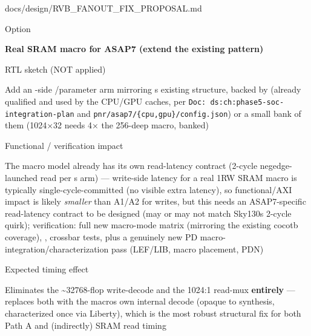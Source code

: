 \begin{relocated}{docs/design/RVB_FANOUT_FIX_PROPOSAL.md}
\begin{rowtable}
\begin{rowcell}{Option}

\textbf{Real SRAM macro for ASAP7 (extend the existing
 pattern)}

\end{rowcell}

\begin{rowcell}{RTL sketch (NOT applied)}

Add an -side /\allowbreak{}parameter arm
mirroring \textquotesingle s existing
 structure, backed by 
(already qualified and used by the CPU/GPU caches, per
\texttt{Doc:\allowbreak{}\ ds:\allowbreak{}ch:\allowbreak{}phase5-\allowbreak{}soc-\allowbreak{}integration-\allowbreak{}plan}
and
\texttt{pnr/\allowbreak{}asap7/\allowbreak{}\{cpu,\allowbreak{}gpu\}/\allowbreak{}config.\allowbreak{}json})
or a small bank of them (1024×32 needs 4× the 256-deep macro, banked)

\end{rowcell}

\begin{rowcell}{Functional / verification impact}

The macro model already has its own read-latency contract (2-cycle
negedge-launched read per
\textquotesingle s 
arm) --- write-side latency for a real 1RW SRAM macro is typically
single-cycle-committed (no visible extra latency), so
functional/\allowbreak{}AXI impact is likely \emph{smaller} than A1/A2
for writes, but this needs an ASAP7-specific read-latency contract to be
designed (may or may not match Sky130\textquotesingle s 2-cycle quirk);
verification: full new  macro-mode matrix
(mirroring the existing  cocotb coverage),
, crossbar tests, plus a genuinely new PD
macro-integration/\allowbreak{}characterization pass (LEF/LIB, macro
placement, PDN)

\end{rowcell}

\begin{rowcell}{Expected timing effect}

Eliminates the \textasciitilde32768-flop write-decode and the 1024:1
read-mux \textbf{entirely} --- replaces both with the
macro\textquotesingle s own internal decode (opaque to synthesis,
characterized once via Liberty), which is the most robust structural fix
for both Path A and (indirectly) SRAM read timing


\end{rowcell}
\end{rowtable}
\end{relocated}
